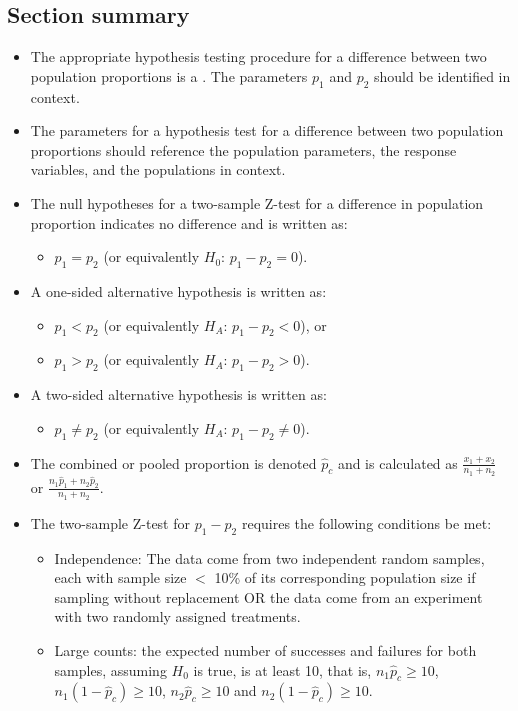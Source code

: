 \subsection*{Section summary}
\begin{itemize}
\item The appropriate hypothesis testing procedure for a difference between two population proportions is a .  The parameters $p_1$ and $p_2$ should be identified in context.

\item The parameters for a hypothesis test for a difference between two
population proportions should reference the population parameters, the
response variables, and the populations in context.

\item The null hypotheses for a two-sample Z-test for a difference in population proportion indicates no difference and is written as:  
\begin{itemize}
\setlength{\itemindent}{3mm}
\item[$H_0$:] $p_1=p_2$ (or equivalently $H_0$: $p_1-p_2 = 0$).  
\end{itemize}
\item A one-sided alternative hypothesis is written as: 
\begin{itemize}
\setlength{\itemindent}{3mm}
\item[$H_A$:] $p_1<p_2$ (or equivalently $H_A$: $p_1-p_2<0$), or
\item[$H_A$:] $p_1>p_2$ (or equivalently $H_A$: $p_1-p_2>0$).
\end{itemize}

\item[] A two-sided alternative hypothesis is written as: 
\begin{itemize}
\setlength{\itemindent}{3mm}
\item[$H_A$:] $p_1\ne p_2$ (or equivalently $H_A$: $p_1-p_2\ne 0$).
\end{itemize}

\item  The combined or pooled proportion is denoted $\hat{p}_c$ and is calculated as $\frac{x_1 + x_2}{n_1 + n_2}$ or $\frac{n_1\hat{p}_1 + n_2\hat{p}_2}{n_1+n_2}$.

\item The two-sample Z-test for $p_1-p_2$ requires the following conditions be met:
\begin{itemize}
\item[1.] Independence:  The data come from two independent random samples, each with sample size $<$ 10\% of its corresponding population size if sampling without replacement OR the data come from an experiment with two randomly assigned treatments.
\item[2.] Large counts: the expected number of successes and failures for both samples, assuming $H_0$ is true, is at least 10, that is,
$n_1\hat{p}_c\ge 10$, $n_1(1-\hat{p}_c)\ge 10$, $n_2\hat{p}_c\ge 10$ and $n_2(1-\hat{p}_c)\ge 10$.  
\end{itemize}



\end{itemize}
